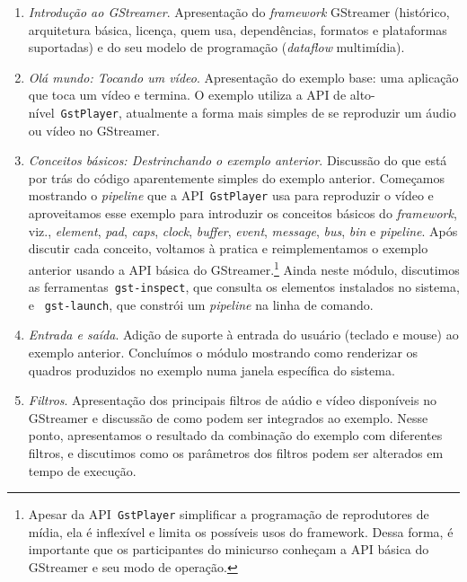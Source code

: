 \documentclass{SBCbookchapter}
\begin{document}
\begin{enumerate}
\item\emph{Introdução ao GStreamer}.  Apresentação do \emph{framework}
  GStreamer (histórico, arquitetura básica, licença, quem usa, dependências,
  formatos e plataformas suportadas) e do seu modelo de programação
  (\emph{dataflow} multimídia).

\item\emph{Olá mundo: Tocando um vídeo}.  Apresentação do exemplo base: uma
  aplicação que toca um vídeo e termina.  O exemplo utiliza a API de
  alto-nível~\texttt{GstPlayer}, atualmente a forma mais simples de se
  reproduzir um áudio ou vídeo no GStreamer.

\item\emph{Conceitos básicos: Destrinchando o exemplo anterior}.  Discussão
  do que está por trás do código aparentemente simples do exemplo anterior.
  Começamos mostrando o \emph{pipeline} que a API~\texttt{GstPlayer} usa
  para reproduzir o vídeo e aproveitamos esse exemplo para introduzir os
  conceitos básicos do \emph{framework}, viz., \emph{element}, \emph{pad},
  \emph{caps}, \emph{clock}, \emph{buffer}, \emph{event}, \emph{message},
  \emph{bus}, \emph{bin} e \emph{pipeline}.  Após discutir cada conceito,
  voltamos à pratica e reimplementamos o exemplo anterior usando a API
  básica do GStreamer.\footnote{Apesar da API~\texttt{GstPlayer} simplificar
    a programação de reprodutores de mídia, ela é inflexível e limita os
    possíveis usos do framework.  Dessa forma, é importante que os
    participantes do minicurso conheçam a API básica do GStreamer e seu modo
    de operação.}  Ainda neste módulo, discutimos as
  ferramentas~\texttt{gst-inspect}, que consulta os elementos instalados no
  sistema, e ~\texttt{gst-launch}, que constrói um \emph{pipeline} na linha
  de comando.

\item\emph{Entrada e saída}.  Adição de suporte à entrada do usuário
  (teclado e mouse) ao exemplo anterior.  Concluímos o módulo mostrando como
  renderizar os quadros produzidos no exemplo numa janela específica do
  sistema.

\item\emph{Filtros}.  Apresentação dos principais filtros de aúdio e vídeo
  disponíveis no GStreamer e discussão de como podem ser integrados ao
  exemplo.  Nesse ponto, apresentamos o resultado da combinação do exemplo
  com diferentes filtros, e discutimos como os parâmetros dos filtros podem
  ser alterados em tempo de execução.


\end{enumerate}
\end{document}
